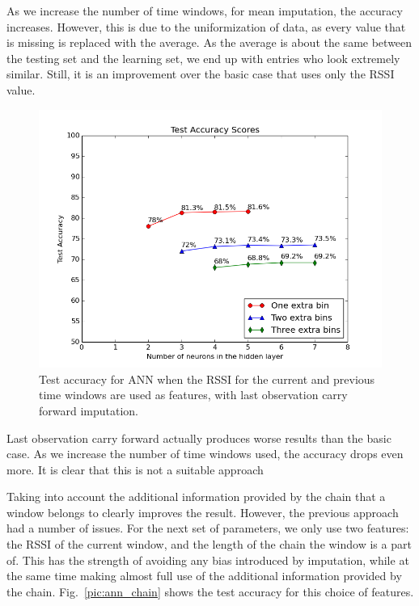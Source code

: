 As we increase the number of time windows, for mean imputation, the accuracy increases. However, this is due to the uniformization of data, as every value that is missing is replaced with the average. As the average is about the same between the testing set and the learning set, we end up with entries who look extremely similar. Still, it is an improvement over the basic case that uses only the RSSI value.  

\begin{figure}[h]
	\begin{center}
		\includegraphics[scale=0.6]{figures/ann_params1.png}
	\end{center}
	
	\caption{Test accuracy for ANN when the RSSI for the current and previous time windows are used as features, with last observation carry forward imputation.}
	\label{pic:ann_params2}

\end{figure}

Last observation carry forward actually produces worse results than the basic case. As we increase the number of time windows used, the accuracy drops even more. It is clear that this is not a suitable approach 

Taking into account the additional information provided by the chain that a window belongs to clearly improves the result. However, the previous approach had a number of issues. For the next set of parameters, we only use two features: the RSSI of the current window, and the length of the chain the window is a part of. This has the strength of avoiding any bias introduced by imputation, while at the same time making almost full use of the additional information provided by the chain. Fig.~\ref{pic:ann_chain} shows the test accuracy for this choice of features.

